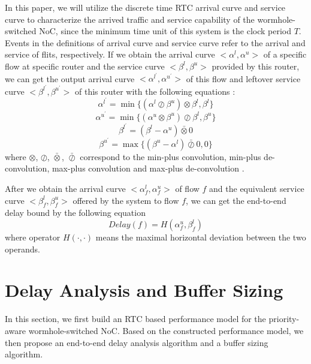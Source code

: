 \documentclass[10pt,journal]{IEEEtran}
\begin{document}
In this paper, we will utilize the discrete time RTC arrival curve and service curve to characterize the arrived traffic and service capability of the wormhole-switched NoC, since the minimum time unit of this system is the clock period $T$. Events in the definitions of arrival curve and service curve refer to the arrival and service of flits, respectively. If we obtain the arrival curve $<\alpha^l,\alpha^u>$ of a specific flow at specific router and the service curve $<\beta^l,\beta^u>$ provided by this router, we can get the output arrival curve $<\alpha^{l^\prime},\alpha^{u^\prime}>$ of this flow and leftover service curve $<\beta^{l^\prime},\beta^{u^\prime}>$ of this router with the following equations \cite{1253607}:
\begin{equation}\label{alphal}
\alpha^{l^\prime}=\min\{(\alpha^l\oslash\beta^u)\otimes\beta^l,\beta^l\}
\end{equation}
\begin{equation}\label{alphau}
\alpha^{u^\prime}=\min\{(\alpha^u\otimes\beta^u)\oslash\beta^l,\beta^u\}
\end{equation}
\begin{equation}\label{betal}
\beta^{l^\prime}=(\beta^l-\alpha^u)\bar{\otimes}0
\end{equation}
\begin{equation}\label{betau}
\beta^{u^\prime}=\max\{(\beta^u-\alpha^l)\bar{\oslash}0,0\}
\end{equation}
where $\otimes$, $\oslash$, $\bar{\otimes}$, $\bar{\oslash}$ correspond to the min-plus convolution, min-plus de-convolution, max-plus convolution and max-plus de-convolution \cite{Boudec2001Network}.

After we obtain the arrival curve $<\alpha^l_{f},\alpha^u_{f}>$ of flow $f$ and the equivalent service curve $<\beta_{f}^l,\beta_{f}^u>$ offered by the system to flow $f$, we can get the end-to-end delay bound by the following equation \cite{Boudec2001Network}
\begin{equation}\label{delay}
Delay(f)=H(\alpha^u_{f},\beta^l_{f})
\end{equation}
where operator $H(\cdot,\cdot)$ means the maximal horizontal deviation between the two operands.

\section{Delay Analysis and Buffer Sizing}\label{modeling}
In this section, we first build an RTC based performance model for the priority-aware wormhole-switched NoC. Based on the constructed performance model, we then propose an end-to-end delay analysis algorithm and a buffer sizing algorithm.
\end{document}
